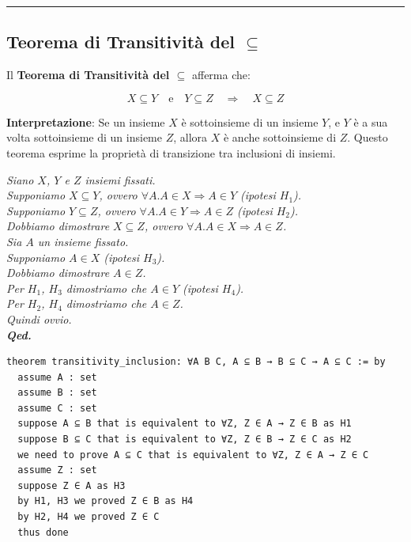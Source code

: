 \documentclass[
  a4paper,
]{article}
\begin{document}
\par\noindent\rule{\linewidth}{0.4pt}\par\vspace{6pt}

\hypertarget{teorema-di-transitivituxe0-del-subseteq}{%
\subsection{\texorpdfstring{Teorema di Transitività del
\(\subseteq\)}{Teorema di Transitività del \textbackslash subseteq}}\label{teorema-di-transitivituxe0-del-subseteq}}

Il \textbf{Teorema di Transitività del \(\subseteq\)} afferma che:

\[
X \subseteq Y \quad \text{e} \quad Y \subseteq Z \quad \Rightarrow \quad X \subseteq Z
\]

\textbf{Interpretazione}: Se un insieme \(X\) è sottoinsieme di un
insieme \(Y\), e \(Y\) è a sua volta sottoinsieme di un insieme \(Z\),
allora \(X\) è anche sottoinsieme di \(Z\). Questo teorema esprime la
proprietà di transizione tra inclusioni di insiemi.

\begin{examplebox}[Dimostrazione]

\emph{Siano \(X\), \(Y\) e \(Z\) insiemi fissati.}\\
\emph{Supponiamo \(X \subseteq Y\), ovvero
\(\forall A.A \in X \Rightarrow A \in Y\) (ipotesi \(H_1\)).}\\
\emph{Supponiamo \(Y \subseteq Z\), ovvero
\(\forall A.A \in Y \Rightarrow A \in Z\) (ipotesi \(H_2\)).}\\
\emph{Dobbiamo dimostrare \(X \subseteq Z\), ovvero
\(\forall A.A \in X \Rightarrow A \in Z\).}\\
\emph{Sia \(A\) un insieme fissato.}\\
\emph{Supponiamo \(A \in X\) (ipotesi \(H_3\)).}\\
\emph{Dobbiamo dimostrare \(A \in Z\).}\\
\emph{Per \(H_1\), \(H_3\) dimostriamo che \(A \in Y\) (ipotesi
\(H_4\)).}\\
\emph{Per \(H_2\), \(H_4\) dimostriamo che \(A \in Z\).}\\
\emph{Quindi ovvio.}\\
\textbf{\emph{Qed.}}

\end{examplebox}

\begin{examplebox}

\begin{lstlisting}
theorem transitivity_inclusion: ∀A B C, A ⊆ B → B ⊆ C → A ⊆ C := by
  assume A : set
  assume B : set
  assume C : set
  suppose A ⊆ B that is equivalent to ∀Z, Z ∈ A → Z ∈ B as H1
  suppose B ⊆ C that is equivalent to ∀Z, Z ∈ B → Z ∈ C as H2
  we need to prove A ⊆ C that is equivalent to ∀Z, Z ∈ A → Z ∈ C 
  assume Z : set
  suppose Z ∈ A as H3
  by H1, H3 we proved Z ∈ B as H4
  by H2, H4 we proved Z ∈ C
  thus done
\end{lstlisting}

\end{examplebox}
\end{document}
